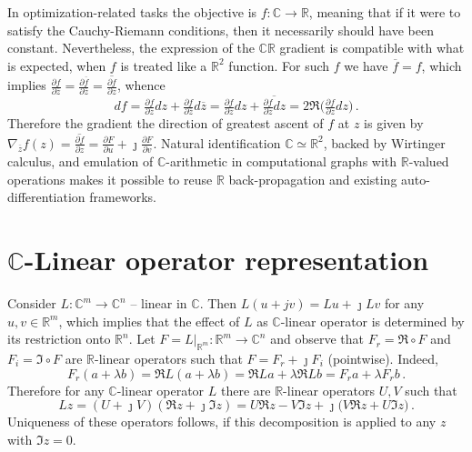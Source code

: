 \documentclass[a4paper,10pt,twocolumn]{article}
\newcommand{\real}{\mathbb{R}}
\newcommand{\cplx}{\mathbb{C}}
\newcommand{\iu}{{\jmath}}
\newcommand{\conj}[1]{\overline{#1}}
\begin{document}
In optimization-related tasks the objective is $
  f\colon \cplx\to \real
$, meaning that if it were to satisfy the Cauchy-Riemann conditions, then it necessarily
should have been constant. Nevertheless, the expression of the $\cplx\real$ gradient is
compatible with what is expected, when $f$ is treated like a $\real^2$ function. For such
$f$ we have $\conj{f} = f$, which implies $
  \tfrac{\partial f}{\partial \conj{z}}
    = \tfrac{\partial \conj{f}}{\partial \conj{z}}
    = \conj{\tfrac{\partial f}{\partial z}}
$, whence
\begin{equation*}
  df
    = \tfrac{\partial f}{\partial z} dz
      + \tfrac{\partial f}{\partial \conj{z}} d\conj{z}
    = \tfrac{\partial f}{\partial z} dz
      + \conj{\tfrac{\partial f}{\partial z} dz}
    = 2 \Re
      \bigl(
        \tfrac{\partial f}{\partial z} dz
      \bigr)
    \,.
\end{equation*}
Therefore the gradient the direction of greatest ascent of $f$ at $z$ is given by $
  \nabla_{\conj{z}} f(z)
    = \conj{\tfrac{\partial f}{\partial z}}
    = \tfrac{\partial F}{\partial u}
    + \iu \tfrac{\partial F}{\partial v}
$.
Natural identification $\cplx \simeq \real^2$, backed by Wirtinger calculus, and emulation
of $\cplx$-arithmetic in computational graphs with $\real$-valued operations makes it
possible to reuse $\real$ back-propagation and existing auto-differentiation frameworks.


\section{$\cplx$-Linear operator representation} %
\label{sec:c-linear_operator_representation}

Consider $L \colon \cplx^m \to \cplx^n$ -- linear in $\cplx$. Then $
  L(u + jv) = L u + \iu L v
$ for any $u, v \in \real^m$, which implies that the effect of $L$ as $\cplx$-linear
operator is determined by its restriction onto $\real^n$. Let $
  F = L\vert_{\real^m}
  \colon \real^m \to \cplx^n
$ and observe that $F_r = \Re \circ F$ and $F_i = \Im \circ F$ are $\real$-linear operators
such that $F = F_r + \iu F_i$ (pointwise). Indeed,
$$
  F_r(a + \lambda b)
  = \Re L(a + \lambda b)
  = \Re L a + \lambda \Re L b
  = F_r a + \lambda F_r b
  \,. $$
Therefore for any $\cplx$-linear operator $L$ there are $\real$-linear operators $U, V$
such that
$$
L z 
  = (U + \iu V) (\Re z + \iu \Im z)
  = U \Re z - V \Im z + \iu \bigl( V \Re z + U \Im z \bigr)
  \,. $$
Uniqueness of these operators follows, if this decomposition is applied to any $z$ with
$\Im z = 0$.


\end{document}
